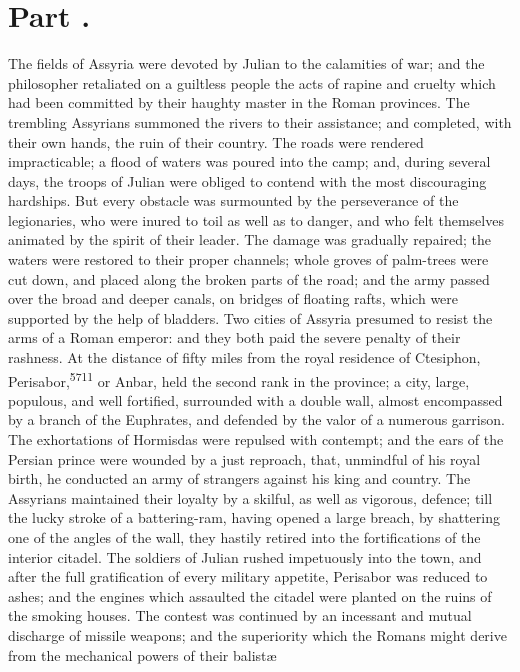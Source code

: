 \section{Part \thesection.}

The fields of Assyria were devoted by Julian to the calamities of
war; and the philosopher retaliated on a guiltless people the
acts of rapine and cruelty which had been committed by their
haughty master in the Roman provinces. The trembling Assyrians
summoned the rivers to their assistance; and completed, with
their own hands, the ruin of their country. The roads were
rendered impracticable; a flood of waters was poured into the
camp; and, during several days, the troops of Julian were obliged
to contend with the most discouraging hardships. But every
obstacle was surmounted by the perseverance of the legionaries,
who were inured to toil as well as to danger, and who felt
themselves animated by the spirit of their leader. The damage was
gradually repaired; the waters were restored to their proper
channels; whole groves of palm-trees were cut down, and placed
along the broken parts of the road; and the army passed over the
broad and deeper canals, on bridges of floating rafts, which were
supported by the help of bladders. Two cities of Assyria presumed
to resist the arms of a Roman emperor: and they both paid the
severe penalty of their rashness. At the distance of fifty miles
from the royal residence of Ctesiphon, Perisabor,\textsuperscript{5711} or Anbar,
held the second rank in the province; a city, large, populous,
and well fortified, surrounded with a double wall, almost
encompassed by a branch of the Euphrates, and defended by the
valor of a numerous garrison. The exhortations of Hormisdas were
repulsed with contempt; and the ears of the Persian prince were
wounded by a just reproach, that, unmindful of his royal birth,
he conducted an army of strangers against his king and country.
The Assyrians maintained their loyalty by a skilful, as well as
vigorous, defence; till the lucky stroke of a battering-ram,
having opened a large breach, by shattering one of the angles of
the wall, they hastily retired into the fortifications of the
interior citadel. The soldiers of Julian rushed impetuously into
the town, and after the full gratification of every military
appetite, Perisabor was reduced to ashes; and the engines which
assaulted the citadel were planted on the ruins of the smoking
houses. The contest was continued by an incessant and mutual
discharge of missile weapons; and the superiority which the
Romans might derive from the mechanical powers of their balistæ
